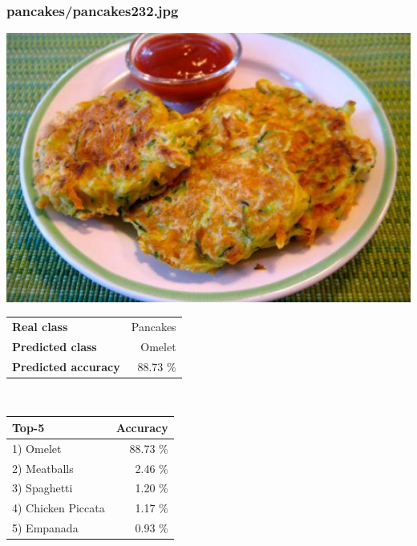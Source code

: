 \subsubsection{pancakes/pancakes232.jpg}

\begin{minipage}[t]{0.4\textwidth}
	\vspace{0pt}
	\includegraphics[width=\linewidth]{images/evaluation-images/pancakes/pancakes232.jpg}
\end{minipage}
\hfill
\begin{minipage}[t]{0.5\textwidth}
	\vspace{0pt}\raggedright
	\begin{tabularx}{\textwidth}{X r}
		\small \textbf{Real class} & \small Pancakes\\
		\small \textbf{Predicted class} & \small Omelet\\
		\small \textbf{Predicted accuracy} & \small 88.73 \%
    \end{tabularx}\\
    
    \vspace{6pt}
	\begin{tabularx}{\textwidth}{X r}
        \small \textbf{Top-5} & \small \textbf{Accuracy} \\
        \hline
		\small 1) Omelet & \small 88.73 \%\\\small 2) Meatballs & \small 2.46 \%\\\small 3) Spaghetti & \small 1.20 \%\\\small 4) Chicken Piccata & \small 1.17 \%\\\small 5) Empanada & \small 0.93 \%
    \end{tabularx}
\end{minipage}
    

